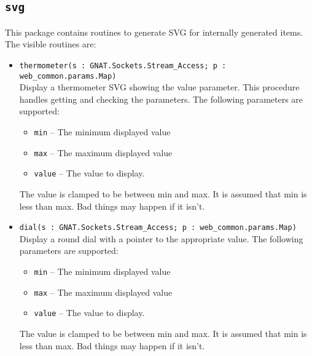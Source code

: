\documentclass[10pt, openany, draft]{article}
\begin{document}
\subsection{\texttt{svg}}
This package contains routines to generate SVG for internally generated items.  The visible routines are:
\begin{itemize}
  \item \verb|thermometer(s : GNAT.Sockets.Stream_Access; p : web_common.params.Map)|\\
  Display a thermometer SVG showing the value parameter.  This procedure handles getting and checking the parameters.  The following parameters are supported:
  \begin{itemize}
    \item \texttt{min} -- The minimum displayed value
    \item \texttt{max} -- The maximum displayed value
    \item \texttt{value} -- The value to display.
  \end{itemize}
  The value is clamped to be between min and max.  It is assumed that min is less than max.  Bad things may happen if it isn't.
  \item \verb|dial(s : GNAT.Sockets.Stream_Access; p : web_common.params.Map)|\\
  Display a round dial with a pointer to the appropriate value. The following parameters are supported:
  \begin{itemize}
    \item \texttt{min} -- The minimum displayed value
    \item \texttt{max} -- The maximum displayed value
    \item \texttt{value} -- The value to display.
  \end{itemize}
  The value is clamped to be between min and max.  It is assumed that min is less than max.  Bad things may happen if it isn't.
\end{itemize}
\end{document}
